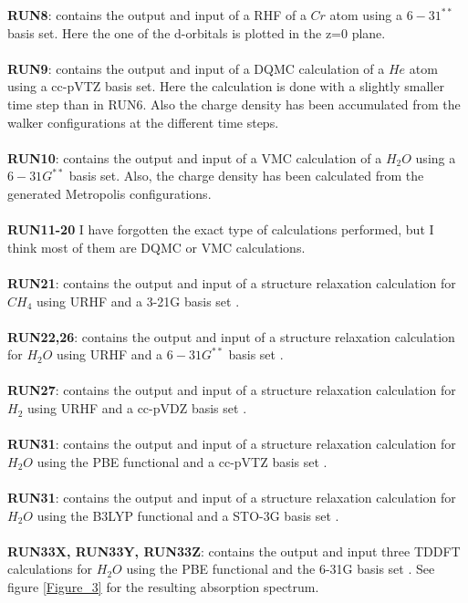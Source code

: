 \documentclass[a4paper,twoside,openany]{book}
\begin{document}
{{\noindent
{\bf RUN8}: contains the output and input of a RHF of a  $Cr$ atom  using a $6-31^{**}$ basis set. Here the one of the d-orbitals  is plotted in the z=0 plane. \\ \\
\noindent
{\bf RUN9}: contains the output and input of a DQMC calculation of a $He$ atom using a cc-pVTZ basis set. Here the calculation is done with 
a slightly smaller time step than in RUN6. Also the charge density has been accumulated from the walker configurations at the different time steps. \\ \\
\noindent
{\bf RUN10}: contains the output and input of a VMC calculation of a $H_{2}O$ using a $6-31G^{**}$ basis set. Also, the charge density has been calculated
from the generated Metropolis configurations.\\ \\
\noindent
{\bf RUN11-20} I have forgotten the exact type of calculations performed, but I think most of them are DQMC or VMC calculations. \\ \\
{\bf RUN21}: contains the output and input of a structure relaxation calculation for $CH_{4}$ using URHF and a 3-21G basis set .\\ \\
\noindent
{\bf RUN22,26}: contains the output and input of a structure relaxation calculation for $H_{2}O$ using URHF and a $6-31G^{**}$ basis set .\\ \\
\noindent
{\bf RUN27}: contains the output and input of a structure relaxation calculation for $H_{2}$ using URHF and a cc-pVDZ basis set .\\ \\
\noindent
{\bf RUN31}: contains the output and input of a structure relaxation calculation for $H_{2}O$ using the PBE functional  and a cc-pVTZ basis set .\\ \\
\noindent
{\bf RUN31}: contains the output and input of a structure relaxation calculation for $H_{2}O$ using the B3LYP  functional  and a STO-3G basis set .\\ \\
\noindent
{\bf RUN33X, RUN33Y, RUN33Z}: contains the output and input three TDDFT calculations  for $H_{2}O$ using the PBE  functional  and  the 6-31G  basis set .
See figure \ref{Figure_3} for the resulting absorption spectrum.\\ \\

}}
\end{document}
